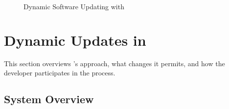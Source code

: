 

\begin{figure}[t]
\begin{center}
\end{center}
\caption{Dynamic Software Updating with \DSU}
\label{fig:overview}
\end{figure}





\section{Dynamic Updates in \DSU}

This section overviews \DSU's approach, what changes it permits, and
how the developer participates in the process.

\subsection{System Overview}
\label{sec:overview}

